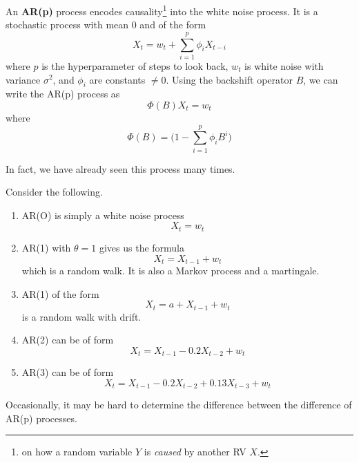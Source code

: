 \documentclass{article}
\begin{document}
  \begin{definition}
    An \textbf{AR(p)} process encodes causality\footnote{on how a random variable $Y$ is \textit{caused} by another RV $X$.} into the white noise process. It is a stochastic process with mean $0$ and of the form 
    \begin{equation}
      X_t = w_t + \sum_{i=1}^p \phi_i X_{t - i}
    \end{equation}
    where $p$ is the hyperparameter of steps to look back, $w_t$ is white noise with variance $\sigma^2$, and $\phi_i$ are constants $\neq 0$. Using the backshift operator $B$, we can write the AR(p) process as 
    \begin{equation}
      \Phi(B) X_t = w_t
    \end{equation}
    where 
    \begin{equation}
      \Phi(B) = \bigg( 1 - \sum_{i=1}^p \phi_i B^i \bigg)
    \end{equation}
  \end{definition}

  In fact, we have already seen this process many times. 
  
  \begin{example}[AR(p) Processes]
    Consider the following. 
    \begin{enumerate}
      \item AR(O) is simply a white noise process 
        \begin{equation}
          X_t = w_t
        \end{equation}
      \item AR(1) with $\theta = 1$ gives us the formula 
        \begin{equation}
          X_t = X_{t-1} + w_t
        \end{equation}
        which is a random walk. It is also a Markov process and a martingale. 
      \item AR(1) of the form 
        \begin{equation}
          X_t = a + X_{t-1} + w_t
        \end{equation}
        is a random walk with drift. 
      \item AR(2) can be of form 
        \begin{equation}
          X_t = X_{t-1} - 0.2 X_{t-2} + w_t
        \end{equation}
      \item AR(3) can be of form 
        \begin{equation}
          X_t = X_{t-1} - 0.2 X_{t-2} + 0.13 X_{t-3} + w_t
        \end{equation}
    \end{enumerate}
    Occasionally, it may be hard to determine the difference between the difference of AR(p) processes. 
  \end{example}
\end{document}
